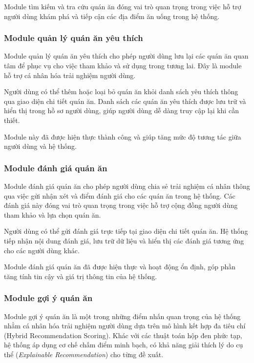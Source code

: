 Module tìm kiếm và tra cứu quán ăn đóng vai trò quan trọng trong việc hỗ trợ người dùng khám phá và tiếp cận các địa điểm ăn uống trong hệ thống.
\subsubsection{Module quản lý quán ăn yêu thích}
Module quản lý quán ăn yêu thích cho phép người dùng lưu lại các quán ăn quan tâm để phục vụ cho việc tham khảo và sử dụng trong tương lai. Đây là module hỗ trợ cá nhân hóa trải nghiệm người dùng.

Người dùng có thể thêm hoặc loại bỏ quán ăn khỏi danh sách yêu thích thông qua
giao diện chi tiết quán ăn. Danh sách các quán ăn yêu thích được lưu trữ và hiển thị trong hồ sơ người dùng, giúp người dùng dễ dàng truy cập lại khi cần thiết.

Module này đã được hiện thực thành công và giúp tăng mức độ tương tác giữa người
dùng và hệ thống.
\subsubsection{Module đánh giá quán ăn}
Module đánh giá quán ăn cho phép người dùng chia sẻ trải nghiệm cá nhân thông qua việc gửi nhận xét và điểm đánh giá cho các quán ăn trong hệ thống. Các đánh giá này đóng vai trò quan trọng trong việc hỗ trợ cộng đồng người dùng tham khảo và lựa chọn quán ăn.

Người dùng có thể gửi đánh giá trực tiếp tại giao diện chi tiết quán ăn. Hệ thống tiếp nhận nội dung đánh giá, lưu trữ dữ liệu và hiển thị các đánh giá tương ứng cho các người dùng khác.

Module đánh giá quán ăn đã được hiện thực và hoạt động ổn định, góp phần tăng tính tin cậy và giá trị thông tin của hệ thống.

\subsubsection{Module gợi ý quán ăn}
Module gợi ý quán ăn là một trong những điểm nhấn quan trọng của hệ thống nhằm cá nhân hóa trải nghiệm người dùng dựa trên mô hình kết hợp đa tiêu chí (Hybrid Recommendation Scoring). Khác với các thuật toán hộp đen phức tạp, hệ thống áp dụng cơ chế chấm điểm minh bạch, có khả năng giải thích lý do cụ thể (\textit{Explainable Recommendation}) cho từng đề xuất.

